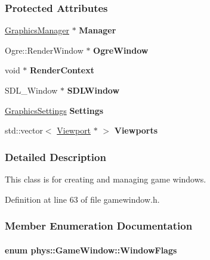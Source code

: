 \subsubsection*{Protected Attributes}
\begin{DoxyCompactItemize}
\item 
\hypertarget{classphys_1_1GameWindow_aace5dc5e9cf498b22b9a905af66a7a4f}{
\hyperlink{classphys_1_1GraphicsManager}{GraphicsManager} $\ast$ {\bfseries Manager}}
\label{classphys_1_1GameWindow_aace5dc5e9cf498b22b9a905af66a7a4f}

\item 
\hypertarget{classphys_1_1GameWindow_a0d8246623e8eec745b03f029215b2a6b}{
Ogre::RenderWindow $\ast$ {\bfseries OgreWindow}}
\label{classphys_1_1GameWindow_a0d8246623e8eec745b03f029215b2a6b}

\item 
\hypertarget{classphys_1_1GameWindow_a0a16b6a49ffaac90ad9368793ea2d26f}{
void $\ast$ {\bfseries RenderContext}}
\label{classphys_1_1GameWindow_a0a16b6a49ffaac90ad9368793ea2d26f}

\item 
\hypertarget{classphys_1_1GameWindow_aa1d07338b6b6fd40b2fc7b6c813d721e}{
SDL\_\-Window $\ast$ {\bfseries SDLWindow}}
\label{classphys_1_1GameWindow_aa1d07338b6b6fd40b2fc7b6c813d721e}

\item 
\hypertarget{classphys_1_1GameWindow_a1dba5999dd50a73b46b7aa0f53e7e529}{
\hyperlink{structphys_1_1GraphicsSettings}{GraphicsSettings} {\bfseries Settings}}
\label{classphys_1_1GameWindow_a1dba5999dd50a73b46b7aa0f53e7e529}

\item 
\hypertarget{classphys_1_1GameWindow_a64b3471c627e82f4f66eb25d1db2893a}{
std::vector$<$ \hyperlink{classphys_1_1Viewport}{Viewport} $\ast$ $>$ {\bfseries Viewports}}
\label{classphys_1_1GameWindow_a64b3471c627e82f4f66eb25d1db2893a}

\end{DoxyCompactItemize}


\subsubsection{Detailed Description}
This class is for creating and managing game windows. 

Definition at line 63 of file gamewindow.h.



\subsubsection{Member Enumeration Documentation}
\hypertarget{classphys_1_1GameWindow_ae4c6f1cc436ac9f20e43bd21a99885f5}{
\paragraph[{WindowFlags}]{\setlength{\rightskip}{0pt plus 5cm}enum {\bf phys::GameWindow::WindowFlags}}\hfill}
\label{classphys_1_1GameWindow_ae4c6f1cc436ac9f20e43bd21a99885f5}


